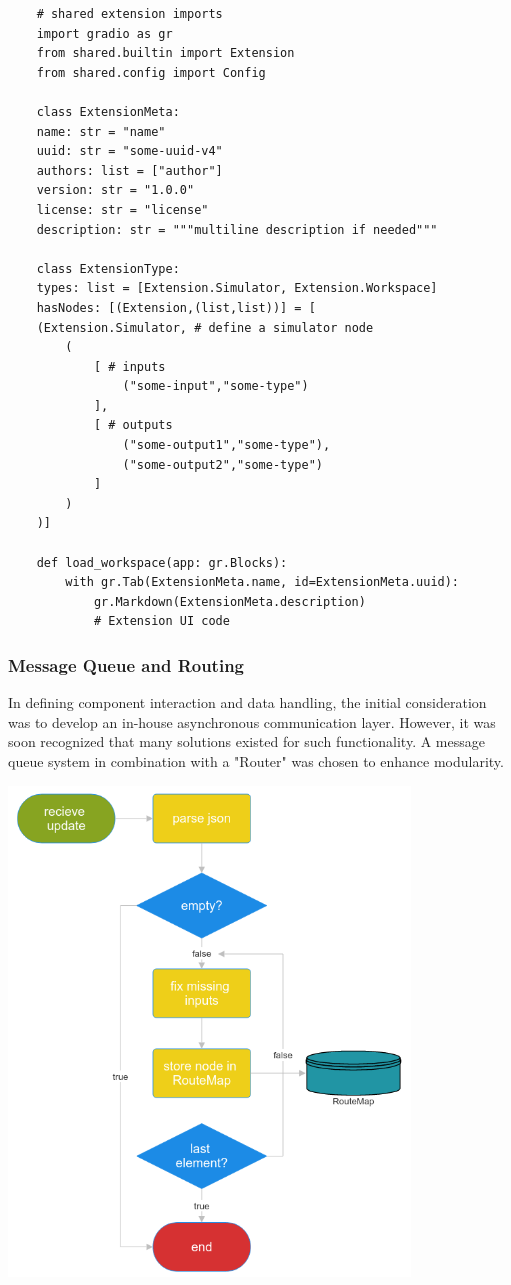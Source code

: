 \documentclass[11pt, a4paper, titlepage]{article}
\begin{document}
\begin{verbatim}
	# shared extension imports
	import gradio as gr
	from shared.builtin import Extension
	from shared.config import Config
	
	class ExtensionMeta:
	name: str = "name"
	uuid: str = "some-uuid-v4"
	authors: list = ["author"]
	version: str = "1.0.0"
	license: str = "license"
	description: str = """multiline description if needed"""

	class ExtensionType:
	types: list = [Extension.Simulator, Extension.Workspace]
	hasNodes: [(Extension,(list,list))] = [
	(Extension.Simulator, # define a simulator node
		(
			[ # inputs
				("some-input","some-type")
			],
			[ # outputs
				("some-output1","some-type"), 
				("some-output2","some-type")
			]
		)
	)]
	
	def load_workspace(app: gr.Blocks):
		with gr.Tab(ExtensionMeta.name, id=ExtensionMeta.uuid):
			gr.Markdown(ExtensionMeta.description)
			# Extension UI code

\end{verbatim}
\newpage

\subsubsection{Message Queue and Routing}

In defining component interaction and data handling, the initial consideration was to develop an in-house asynchronous communication layer. However, it was soon recognized that many solutions existed for such functionality. A message queue system in combination with a "Router" was chosen to enhance modularity.

\begin{center}
	\includegraphics[width=0.8\textwidth]{nodegen-flow.png}
\end{center}
\end{document}
